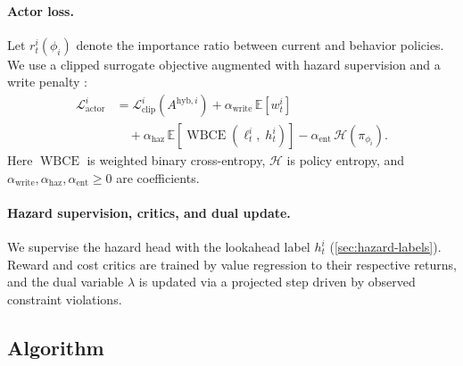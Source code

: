 \documentclass{article}
\theoremstyle{plain}
\theoremstyle{definition}
\theoremstyle{remark}
\begin{document}
\paragraph{Actor loss.}
Let $r_t^i(\phi_i)$ denote the importance ratio between current and behavior policies.
We use a clipped surrogate objective augmented with hazard supervision and a write penalty \cite{schulman2017proximalpolicyoptimizationalgorithms}:
\begin{equation}
\label{eq:actor-total}
\begin{aligned}
\mathcal{L}_{\text{actor}}^i
&=
\mathcal{L}_{\text{clip}}^i\!\left(A^{\text{hyb},i}\right)
+
\alpha_{\text{write}}\,
\mathbb{E}\!\left[w_t^i\right]
\\
&\quad
+
\alpha_{\text{haz}}\,
\mathbb{E}\!\left[
\operatorname{WBCE}\!\left(\ell_t^i,\; h_t^i\right)
\right]
-
\alpha_{\text{ent}}\,
\mathcal{H}\!\left(\pi_{\phi_i}\right).
\end{aligned}
\end{equation}
Here $\operatorname{WBCE}$ is weighted binary cross-entropy, $\mathcal{H}$ is policy entropy, and $\alpha_{\text{write}},\alpha_{\text{haz}},\alpha_{\text{ent}}\ge 0$ are coefficients.



\paragraph{Hazard supervision, critics, and dual update.}
We supervise the hazard head with the lookahead label $h_t^i$ (\cref{sec:hazard-labels}). Reward and cost critics are trained by value regression to their respective returns, and the dual variable $\lambda$ is updated via a projected step driven by observed constraint violations.


\subsection{Algorithm}
\label{sec:algorithm}
\end{document}
